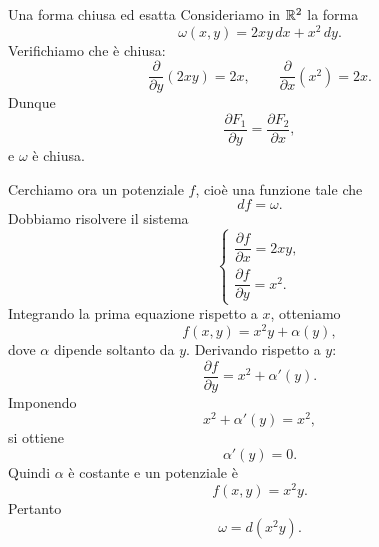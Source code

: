 \documentclass[a4paper]{article}
\begin{document}
\begin{snippetexample}{Una forma chiusa ed esatta}
    Consideriamo in \(\mathbb{R}^2\) la forma
    \[
        \omega(x,y)=2xy\,dx+x^2\,dy.
    \]
    Verifichiamo che è chiusa:
    \[
        \frac{\partial}{\partial y}(2xy)=2x,
        \qquad
        \frac{\partial}{\partial x}(x^2)=2x.
    \]
    Dunque
    \[
        \frac{\partial F_1}{\partial y}
        =
        \frac{\partial F_2}{\partial x},
    \]
    e \(\omega\) è chiusa.

    Cerchiamo ora un potenziale \(f\), cioè una funzione tale che
    \[
        df=\omega.
    \]
    Dobbiamo risolvere il sistema
    \[
        \begin{cases}
            \dfrac{\partial f}{\partial x}=2xy,\\[4pt]
            \dfrac{\partial f}{\partial y}=x^2.
        \end{cases}
    \]
    Integrando la prima equazione rispetto a \(x\), otteniamo
    \[
        f(x,y)=x^2y+\alpha(y),
    \]
    dove \(\alpha\) dipende soltanto da \(y\). Derivando rispetto a \(y\):
    \[
        \frac{\partial f}{\partial y}
        =
        x^2+\alpha'(y).
    \]
    Imponendo
    \[
        x^2+\alpha'(y)=x^2,
    \]
    si ottiene
    \[
        \alpha'(y)=0.
    \]
    Quindi \(\alpha\) è costante e un potenziale è
    \[
        f(x,y)=x^2y.
    \]
    Pertanto
    \[
        \omega=d(x^2y).
    \]
\end{snippetexample}
\end{document}
